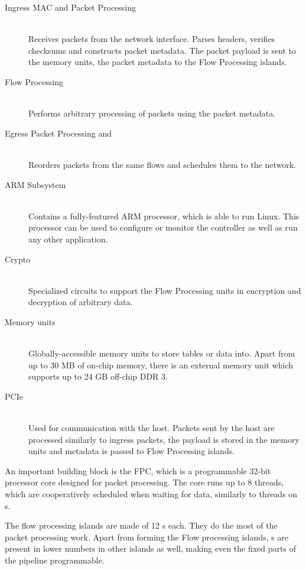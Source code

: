 \begin{description}
	\item[Ingress MAC and Packet Processing] \hfill \\
		Receives packets from the network interface. Parses headers, verifies
		checksums and constructs packet metadata. The packet payload is sent to
		the memory units, the packet metadata to the Flow Processing islands.
	\item[Flow Processing] \hfill \\
		Performs arbitrary processing of packets using the packet metadata.
	\item[Egress Packet Processing and ] \hfill \\
		Reorders packets from the same flows and schedules them to the network.
	\item[ARM Subsystem] \hfill \\
		Contains a fully-featured ARM processor, which is able to run Linux.
		This processor can be used to configure or monitor the controller as
		well as run any other application.
	\item[Crypto] \hfill \\
		Specialized circuits to support the Flow Processing units in encryption and
		decryption of arbitrary data.
	\item[Memory units] \hfill \\
		Globally-accessible memory units to store tables or data into. Apart
		from up to 30 MB of on-chip memory, there is an external memory unit which
		supports up to 24 GB off-chip DDR 3.
	\item[PCIe] \hfill \\
		Used for communication with the host. Packets sent by the host are
		processed similarly to ingress packets, the payload is stored in the
		memory units and metadata is passed to Flow Processing islands.
\end{description}

\noindent An important building block is the \acrfull{FPC}, which is a programmable 32-bit
processor core designed for packet processing. The core runs up to 8 threads,
which are cooperatively scheduled when waiting for data, similarly to threads
on s.

The flow processing islands are made of 12 s each. They do the most of the
packet processing work. Apart from forming the Flow processing islands,
s are present in lower numbers in other islands as well, making even the
fixed parts of the pipeline programmable.

